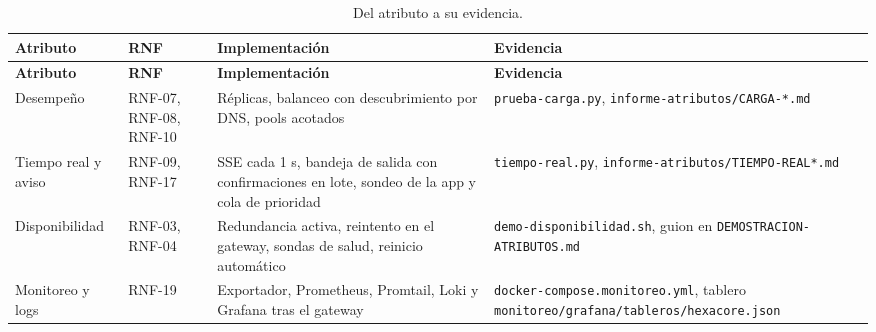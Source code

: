 \begin{center}
\begin{longtable}{|>{\raggedright\arraybackslash}p{2.6cm}|>{\raggedright\arraybackslash}p{2.2cm}|>{\raggedright\arraybackslash}p{4.4cm}|>{\raggedright\arraybackslash}p{4.4cm}|}
\caption{Del atributo a su evidencia.}\label{tab:atributos-trazabilidad}\\
\hline
\textbf{Atributo} & \textbf{RNF} & \textbf{Implementación} & \textbf{Evidencia}\\
\hline
\endfirsthead
\hline
\textbf{Atributo} & \textbf{RNF} & \textbf{Implementación} & \textbf{Evidencia}\\
\hline
\endhead
Desempeño & RNF-07, RNF-08, RNF-10 & Réplicas, balanceo con descubrimiento por DNS, pools acotados &
\texttt{prueba-carga.py}, \texttt{informe-atributos/\allowbreak CARGA-*.md}\\
\hline
Tiempo real y aviso & RNF-09, RNF-17 & SSE cada 1 s, bandeja de salida con confirmaciones en
lote, sondeo de la app y cola de prioridad & \texttt{tiempo-real.py},
\texttt{informe-atributos/\allowbreak TIEMPO-REAL*.md}\\
\hline
Disponibilidad & RNF-03, RNF-04 & Redundancia activa, reintento en el gateway, sondas de salud,
reinicio automático & \texttt{demo-\allowbreak disponibilidad.sh}, guion en
\texttt{DEMOSTRACION-\allowbreak ATRIBUTOS.md}\\
\hline
Monitoreo y logs & RNF-19 & Exportador, Prometheus, Promtail, Loki y Grafana tras el gateway &
\texttt{docker-compose.\allowbreak monitoreo.yml}, tablero \texttt{monitoreo/\allowbreak grafana/\allowbreak tableros/\allowbreak hexacore.json}\\
\hline
\end{longtable}
\end{center}
